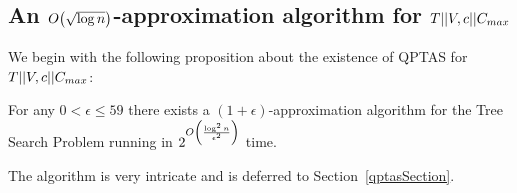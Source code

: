 \subsection{An $O\mathopen{}\left( \sqrt{\log n} \right)$-approximation algorithm for $T||V,c||C_{max}$}
\label{sec:sqrt_log_n_approx}
We begin with the following proposition \cite{dereniowski2017ApproxSsForGeneralBSinWTs} about the existence of QPTAS for $T||V,c||C_{max}$:
\begin{proposition}\label{QPTAS}
     For any $0 < \epsilon \leq 59$ there exists a $(1+\epsilon)$-approximation algorithm for the Tree Search Problem running in $2^{O\mathopen{}\left( \frac{\log^2n}{\epsilon^2} \right)}$ time.
\end{proposition}

The algorithm is very intricate and  is deferred to Section~\ref{qptasSection}.

